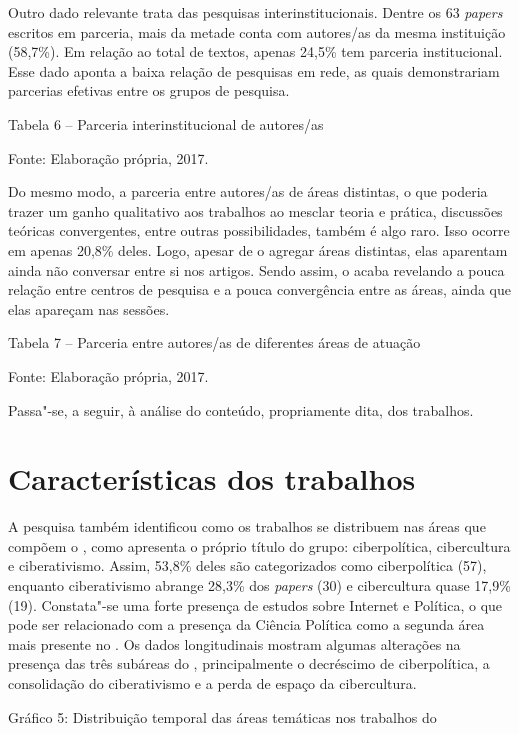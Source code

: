 Outro dado relevante trata das pesquisas interinstitucionais. Dentre os
63 \emph{papers} escritos em parceria, mais da metade conta com
autores/as da mesma instituição (58,7\%). Em relação ao total de textos,
apenas 24,5\% tem parceria institucional. Esse dado aponta a baixa
relação de pesquisas em rede, as quais demonstrariam parcerias efetivas
entre os grupos de pesquisa.

Tabela 6 -- Parceria interinstitucional de autores/as


Fonte: Elaboração própria, 2017.

Do mesmo modo, a parceria entre autores/as de áreas distintas, o que
poderia trazer um ganho qualitativo aos trabalhos ao mesclar teoria e
prática, discussões teóricas convergentes, entre outras possibilidades,
também é algo raro. Isso ocorre em apenas 20,8\% deles. Logo, apesar de
o  agregar áreas distintas, elas aparentam ainda não conversar entre
si nos artigos. Sendo assim, o  acaba revelando a pouca relação entre
centros de pesquisa e a pouca convergência entre as áreas, ainda que
elas apareçam nas sessões.

Tabela 7 -- Parceria entre autores/as de diferentes áreas de atuação

Fonte: Elaboração própria, 2017.

Passa"-se, a seguir, à análise do conteúdo, propriamente dita, dos
trabalhos.

\section{Características dos trabalhos}

A pesquisa também identificou como os trabalhos se distribuem nas áreas
que compõem o , como apresenta o próprio título do grupo:
ciberpolítica, cibercultura e ciberativismo. Assim, 53,8\% deles são
categorizados como ciberpolítica (57), enquanto ciberativismo abrange
28,3\% dos \emph{papers} (30) e cibercultura quase 17,9\% (19).
Constata"-se uma forte presença de estudos sobre Internet e Política, o
que pode ser relacionado com a presença da Ciência Política como a
segunda área mais presente no . Os dados longitudinais mostram algumas
alterações na presença das três subáreas do , principalmente o
decréscimo de ciberpolítica, a consolidação do ciberativismo e a perda
de espaço da cibercultura.

Gráfico 5: Distribuição temporal das áreas temáticas nos trabalhos do 

